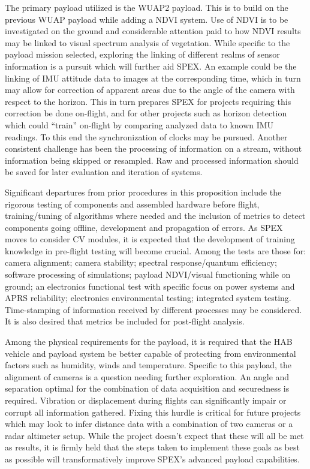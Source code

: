 \documentclass[conference]{IEEEtran} %
\begin{document}
The primary payload utilized is the WUAP2 payload. 
This is to build on the previous WUAP payload while adding a NDVI system.
Use of NDVI is to be investigated on the ground and considerable attention paid to how NDVI results may be linked to visual spectrum analysis of vegetation. 
While specific to the payload mission selected, exploring the linking of different realms of sensor information is a pursuit which will further aid SPEX. 
An example could be the linking of IMU attitude data to images at the corresponding time, which in turn may allow for correction of apparent areas due to the angle of the camera with respect to the horizon. 
This in turn prepares SPEX for projects requiring this correction be done on-flight, and for other projects such as horizon detection which could ``train'' on-flight by comparing analyzed data to known IMU readings. 
To this end the synchronization of clocks may be pursued. 
Another consistent challenge has been the processing of information on a stream, without information being skipped or resampled. 
Raw and processed information should be saved for later evaluation and iteration of systems.

Significant departures from prior procedures in this proposition include the rigorous testing of components and assembled hardware before flight, training/tuning of algorithms where needed and the inclusion of metrics to detect components going offline, development and propagation of errors. 
As SPEX moves to consider CV modules, it is expected that the development of training knowledge in pre-flight testing will become crucial. 
Among the tests are those for: camera alignment; camera stability; spectral response/quantum efficiency; software processing of simulations; payload NDVI/visual functioning while on ground; an electronics functional test with specific focus on power systems and APRS reliability; electronics environmental testing; integrated system testing.
Time-stamping of information received by different processes may be considered. 
It is also desired that metrics be included for post-flight analysis.

Among the physical requirements for the payload, it is required that the HAB vehicle and payload system be better capable of protecting from environmental factors such as humidity, winds and temperature. Specific to this payload, the alignment of cameras is a question needing further exploration. An angle and separation optimal for the combination of data acquisition and securedness is required. Vibration or displacement during flights can significantly impair or corrupt all information gathered. Fixing this hurdle is critical for future projects which may look to infer distance data with a combination of two cameras or a radar altimeter setup. While the project doesn't expect that these will all be met as results, it is firmly held that the steps taken to implement these goals as best as possible will transformatively improve SPEX's advanced payload capabilities.
\end{document}
